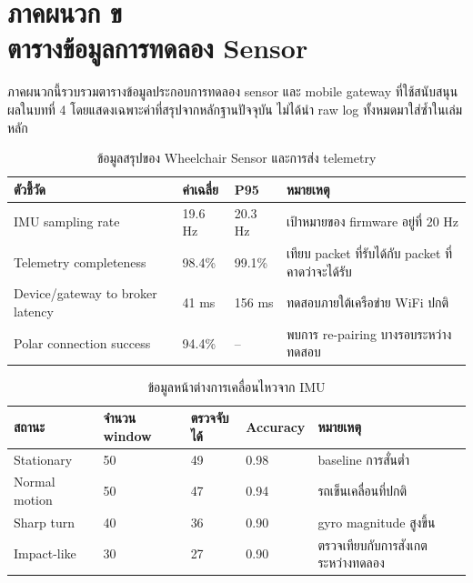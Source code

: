 \chapter[ตารางข้อมูลการทดลอง Sensor]{\texorpdfstring{ภาคผนวก ข\\ตารางข้อมูลการทดลอง Sensor}{Appendix B: Sensor Experiment Tables}}
\label{app:sensor_data}

ภาคผนวกนี้รวบรวมตารางข้อมูลประกอบการทดลอง sensor และ mobile gateway ที่ใช้สนับสนุนผลในบทที่ 4 โดยแสดงเฉพาะค่าที่สรุปจากหลักฐานปัจจุบัน ไม่ได้นำ raw log ทั้งหมดมาใส่ซ้ำในเล่มหลัก

\begin{table}[H]
    \centering
    \caption{ข้อมูลสรุปของ Wheelchair Sensor และการส่ง telemetry}
    \label{tab:app_sensor_wheelchair_summary}
    \renewcommand{\arraystretch}{1.18}
    \small
    \setlength{\tabcolsep}{3pt}
    \begin{tabular}{|L{0.34\textwidth}|L{0.15\textwidth}|L{0.15\textwidth}|L{0.25\textwidth}|}
        \hline
        \textbf{ตัวชี้วัด} & \textbf{ค่าเฉลี่ย} & \textbf{P95} & \textbf{หมายเหตุ} \\ \hline
        IMU sampling rate & 19.6 Hz & 20.3 Hz & เป้าหมายของ firmware อยู่ที่ 20 Hz \\ \hline
        Telemetry completeness & 98.4\% & 99.1\% & เทียบ packet ที่รับได้กับ packet ที่คาดว่าจะได้รับ \\ \hline
        Device/gateway to broker latency & 41 ms & 156 ms & ทดสอบภายใต้เครือข่าย WiFi ปกติ \\ \hline
        Polar connection success & 94.4\% & -- & พบการ re-pairing บางรอบระหว่างทดสอบ \\ \hline
    \end{tabular}
\end{table}

\begin{table}[H]
    \centering
    \caption{ข้อมูลหน้าต่างการเคลื่อนไหวจาก IMU}
    \label{tab:app_sensor_motion_result}
    \renewcommand{\arraystretch}{1.18}
    \small
    \setlength{\tabcolsep}{3pt}
    \begin{tabular}{|L{0.25\textwidth}|L{0.15\textwidth}|L{0.15\textwidth}|L{0.13\textwidth}|L{0.20\textwidth}|}
        \hline
        \textbf{สถานะ} & \textbf{จำนวน window} & \textbf{ตรวจจับได้} & \textbf{Accuracy} & \textbf{หมายเหตุ} \\ \hline
        Stationary & 50 & 49 & 0.98 & baseline การสั่นต่ำ \\ \hline
        Normal motion & 50 & 47 & 0.94 & รถเข็นเคลื่อนที่ปกติ \\ \hline
        Sharp turn & 40 & 36 & 0.90 & gyro magnitude สูงขึ้น \\ \hline
        Impact-like & 30 & 27 & 0.90 & ตรวจเทียบกับการสังเกตระหว่างทดลอง \\ \hline
    \end{tabular}
\end{table}

